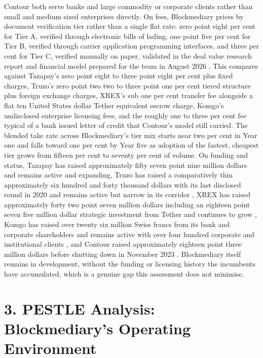 \documentclass[12pt, a4paper]{article}
\begin{document}
Contour both serve banks and large commodity or corporate clients rather than small and
medium sized enterprises directly. On fees, Blockmediary prices by document verification
tier rather than a single flat rate: zero point eight per cent for Tier A, verified through
electronic bills of lading, one point five per cent for Tier B, verified through carrier
application programming interfaces, and three per cent for Tier C, verified manually on
paper, validated in the deal value research report and financial model prepared for the
team in August 2026 \citep{dealvaluereport2026}. This compares against Tazapay's zero
point eight to three point eight per cent plus fixed charges, Truzo's zero point two two
to three point one per cent tiered structure plus foreign exchange charges, XREX's sub one
per cent transfer fee alongside a flat ten United States dollar Tether equivalent escrow
charge, Komgo's undisclosed enterprise licensing fees, and the roughly one to three per
cent fee typical of a bank issued letter of credit that Contour's model still carried. The
blended take rate across Blockmediary's tier mix starts near two per cent in Year one and
falls toward one per cent by Year five as adoption of the fastest, cheapest tier grows from
fifteen per cent to seventy per cent of volume. On funding and status, Tazapay has raised approximately
fifty seven point nine million dollars \citep{tazapayseriesa2023, tazapayseriesb2026} and
remains active and expanding, Truzo has raised a comparatively thin approximately six
hundred and forty thousand dollars with its last disclosed round in 2020 and remains
active but narrow in its corridor \citep{truzouklaunch2023}, XREX has raised approximately
forty two point seven million dollars including an eighteen point seven five million
dollar strategic investment from Tether and continues to grow \citep{xrextether2024}, Komgo
has raised over twenty six million Swiss francs from its bank and corporate shareholders
and remains active with over four hundred corporate and institutional clients
\citep{komgonewsroom2025}, and Contour raised approximately eighteen point three million
dollars before shutting down in November 2023 \citep{contourshutdown2023}. Blockmediary
itself remains in development, without the funding or licensing history the incumbents
have accumulated, which is a genuine gap this assessment does not minimise.

\section*{3. PESTLE Analysis: Blockmediary's Operating Environment}
\end{document}

